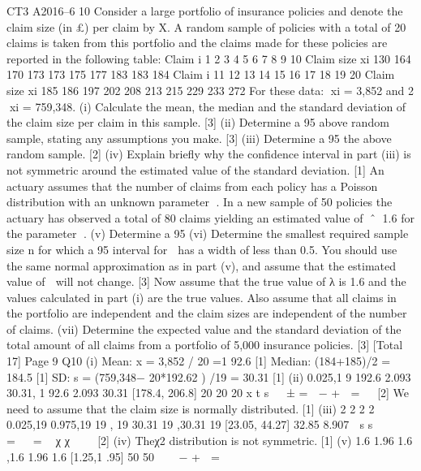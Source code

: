 \documentclass[a4paper,12pt]{article}
\begin{document}
\begin{enumerate}

CT3 A2016–6
10 Consider a large portfolio of insurance policies and denote the claim size (in £) per
claim by X. A random sample of policies with a total of 20 claims is taken from this
portfolio and the claims made for these policies are reported in the following table:
  Claim i 1 2 3 4 5 6 7 8 9 10
Claim size xi 130 164 170 173 173 175 177 183 183 184
Claim i 11 12 13 14 15 16 17 18 19 20
Claim size xi 185 186 197 202 208 213 215 229 233 272
For these data: xi = 3,852 and 2
xi = 759,348.
(i) Calculate the mean, the median and the standard deviation of the claim size
per claim in this sample. [3]
(ii) Determine a 95%
above random sample, stating any assumptions you make. [3]
(iii) Determine a 95%
the above random sample. [2]
(iv) Explain briefly why the confidence interval in part (iii) is not symmetric
around the estimated value of the standard deviation. [1]
An actuary assumes that the number of claims from each policy has a Poisson
distribution with an unknown parameter . In a new sample of 50 policies the actuary
has observed a total of 80 claims yielding an estimated value of ˆ 1.6 for the
parameter .
(v) Determine a 95%
(vi) Determine the smallest required sample size n for which a 95%
interval for  has a width of less than 0.5. You should use the same normal
approximation as in part (v), and assume that the estimated value of  will not
change. [3]
Now assume that the true value of λ is 1.6 and the values calculated in part (i) are the
true values. Also assume that all claims in the portfolio are independent and the claim
sizes are independent of the number of claims.
(vii) Determine the expected value and the standard deviation of the total amount of
all claims from a portfolio of 5,000 insurance policies. [3]
[Total 17]
Page 9
Q10 (i) Mean: x = 3,852 / 20 =1 92.6 [1]
Median: (184+185)/2 = 184.5 [1]
SD: s = (759,348− 20*192.62 ) /19 = 30.31 [1]
(ii) 0.025,1 9
192.6 2.093 30.31, 1 92.6 2.093 30.31 [178.4, 206.8]
20 20 20
x t s  
± =  − +  =
   
[2]
We need to assume that the claim size is normally distributed. [1]
(iii)
2 2
2 2
0.025,19 0.975,19
19 , 19 30.31 19 ,30.31 19 [23.05, 44.27]
32.85 8.907
 s s   
  =   =
   χ χ   
[2]
(iv) Theχ2 distribution is not symmetric. [1]
(v) 1.6 1.96 1.6 ,1.6 1.96 1.6 [1.25,1 .95]
50 50
 
 − +  =

\end{enumerate}
\end{document}
